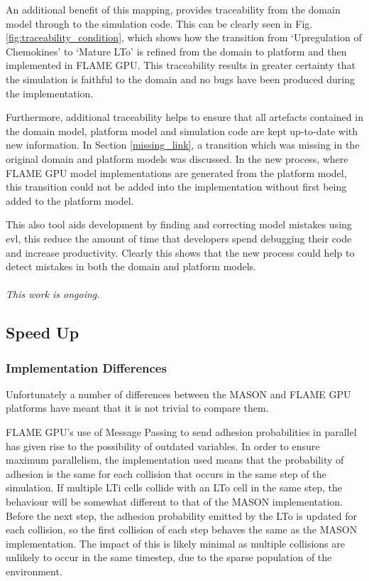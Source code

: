 \documentclass{UoYCSproject}
\begin{document}
An additional benefit of this mapping, provides traceability from the domain model through to the simulation code.
This can be clearly seen in Fig. \ref{fig:traceability_condition}, which shows how the transition from `Upregulation of Chemokines' to `Mature \gls{LTo}' is refined from the \gls{domain} to \gls{platform} and then implemented in \gls{FLAME GPU}.
This traceability results in greater certainty that the simulation is faithful to the domain and no bugs have been produced during the implementation.

Furthermore, additional traceability helps to ensure that all artefacts contained in the domain model, platform model and simulation code are kept up-to-date with new information.
In Section \ref{missing_link}, a transition which was missing in the original domain and platform models was discussed.
In the new process, where \gls{FLAME GPU} model implementations are generated from the platform model, this transition could not be added into the implementation without first being added to the platform model.

This also tool aids development by finding and correcting model mistakes using \gls{evl}, this reduce the amount of time that developers spend debugging their code and increase productivity.
Clearly this shows that the new process could help to detect mistakes in both the domain and platform models.
\\\\
\textit{This work is ongoing.}

\subsection{Speed Up}
\subsubsection{Implementation Differences}
Unfortunately a number of differences between the \gls{MASON} and \gls{FLAME GPU} platforms have meant that it is not trivial to compare them.

\gls{FLAME GPU}'s use of Message Passing to send adhesion probabilities in parallel has given rise to the possibility of outdated variables.
In order to ensure maximum parallelism, the implementation used means that the probability of adhesion is the same for each collision that occurs in the same step of the simulation.
If multiple \gls{LTi} cells collide with an \gls{LTo} cell in the same step, the behaviour will be somewhat different to that of the \gls{MASON} implementation.
Before the next step, the adhesion probability emitted by the \gls{LTo} is updated for each collision, so the first collision of each step behaves the same as the \gls{MASON} implementation.
The impact of this is likely minimal as multiple collisions are unlikely to occur in the same timestep, due to the sparse population of the environment.
\end{document}
